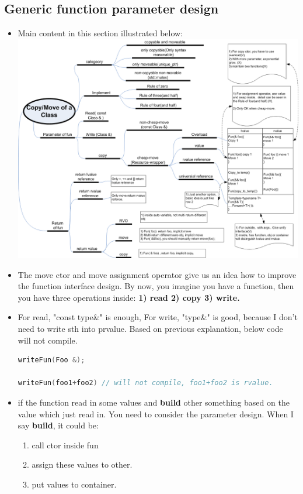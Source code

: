 \documentclass[a4paper,12pt,twoside]{book}
\begin{document}
\subsection{Generic function parameter design}
\begin{itemize}
\item Main content in this section illustrated below: \\
\includegraphics[scale=0.9, angle=270]{pics/move.png}

\item The move ctor and move assignment operator give us an idea how to improve the function interface design. By now, you imagine you have a function, then you have three operations inside: \textbf{1) read 2) copy 3) write.}

\item For read, "const type\&" is enough, For write, "type\&" is good, because I don't need to write sth into prvalue. Based on previous explanation, below code will not compile. 
\begin{lstlisting}[frame=single, language=c++]
writeFun(Foo &);

writeFun(foo1+foo2) // will not compile, foo1+foo2 is rvalue.
\end{lstlisting}

\item if the function read in some values and \textbf{build} other something based on the value which just read in. You need to consider the parameter design. When I say \textbf{build}, it could be:
\begin{enumerate}
	\item call ctor inside fun
	\item assign these values to other.
	\item put values to container.
\end{enumerate} 
\end{itemize}
\end{document}
